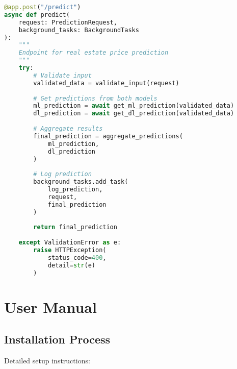 \documentclass[12pt,a4paper]{report}
\begin{document}
\begin{lstlisting}[language=python]
@app.post("/predict")
async def predict(
    request: PredictionRequest,
    background_tasks: BackgroundTasks
):
    """
    Endpoint for real estate price prediction
    """
    try:
        # Validate input
        validated_data = validate_input(request)
        
        # Get predictions from both models
        ml_prediction = await get_ml_prediction(validated_data)
        dl_prediction = await get_dl_prediction(validated_data)
        
        # Aggregate results
        final_prediction = aggregate_predictions(
            ml_prediction, 
            dl_prediction
        )
        
        # Log prediction
        background_tasks.add_task(
            log_prediction, 
            request, 
            final_prediction
        )
        
        return final_prediction
        
    except ValidationError as e:
        raise HTTPException(
            status_code=400, 
            detail=str(e)
        )
\end{lstlisting}

\chapter{User Manual}

\section{Installation Process}
Detailed setup instructions:
\end{document}
